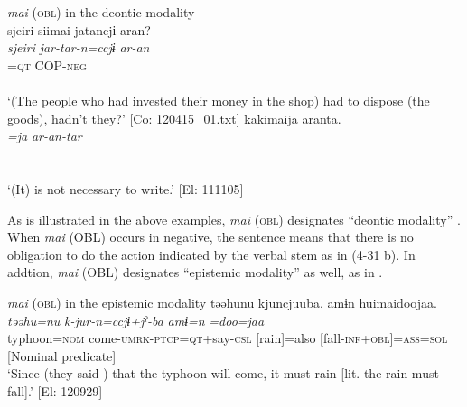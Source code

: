 \ea  \textit{mai} (\textsc{obl}) in the deontic modality \label{ex:4.31}
  \ea{}\\
\gllll {\textbar}sjeiri{\textbar}  siimai  jatancjɨ  aran?\\
      \textit{sjeiri}  \textit{}  \textit{jar-tar-n=ccjɨ}  \textit{ar-an}\\
      [disposal  do-\textsc{inf}+\textsc{obl}  \textsc{cop}-\textsc{pst}-\textsc{ptcp}]=\textsc{qt}  COP-\textsc{neg}\\
      [Nominal predicate]  \\
      \glt       ‘(The people who had invested their money in the shop) had to dispose (the goods), hadn’t they?’ [Co: 120415\_01.txt]
\ex \label{ex:4.31b}%
\gllll kakimaija  aranta.\\
      \textit{=ja}  \textit{ar-an-tar}\\
      [write-\textsc{inf}+\textsc{obl}=\textsc{top}  \textsc{cop}-\textsc{neg}-\textsc{pst}]\\
      [Nominal predicate]\\
      \glt       ‘(It) is not necessary to write.’ [El: 111105]
    \z
\z

As is illustrated in the above examples, \textit{mai} (\textsc{obl}) designates “deontic modality” \citep[823]{Lyons1977}. When \textit{mai} (OBL) occurs in negative, the sentence means that there is no obligation to do the action indicated by the verbal stem as in (4-31 b). In addtion, \textit{mai} (OBL) designates “epistemic modality” \citep[793-809]{Lyons1977} as well, as in .

\ea  \textit{mai} (\textsc{obl}) in the epistemic modality \label{ex:4.32}
  \gllll təəhunu  kjuncjuuba,  amɨn   huimaidoojaa.\\
    \textit{təəhu=nu}  \textit{k-jur-n=ccjɨ+jˀ-ba}  \textit{amɨ=n} \textit{=doo=jaa}\\                                                                   
    typhoon=\textsc{nom}  come-\textsc{umrk}-\textsc{ptcp}=\textsc{qt}+say-\textsc{csl}  [rain]=also  [fall-\textsc{inf}+\textsc{obl}]=\textsc{ass}=\textsc{sol}\\
        [Subject]                                         [Nominal predicate]\\
  \glt ‘Since (they said ) that the typhoon will come, it must rain [lit. the rain must fall].’  [El: 120929]
\z

